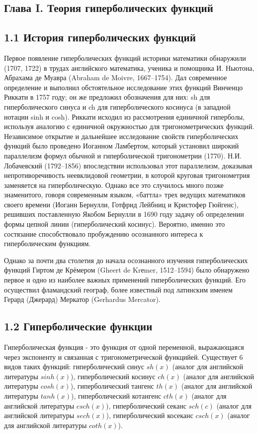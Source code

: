 \documentclass{article}
\begin{document}
\subsection*{Глава I. Теория гиперболических функций}

\subsection*{1.1 История гиперболических функций}

Первое появление гиперболических функций историки математики обнаружили (1707, 1722) в
трудах английского математика, ученика и помощника И. Ньютона, Абрахама де Муавра (Abraham
de Moivre, 1667–1754). Дал современное определение и выполнил обстоятельное исследование этих функций Винченцо Риккати в 1757 году; он
же предложил обозначения для них: sh для гиперболического синуса и ch для гиперболического
косинуса (в западной нотации sinh и cosh). Риккати исходил из рассмотрения единичной гиперболы, используя аналогию с единичной окружностью для тригонометрических функций. Независимое
открытие и дальнейшее исследование свойств гиперболических функций было проведено Иоганном
Ламбертом, который установил широкий параллелизм формул обычной и гиперболической тригонометрии (1770). Н.И. Лобачевский (1792–1856) впоследствии использовал этот параллелизм, доказывая непротиворечивость неевклидовой геометрии, в которой круговая тригонометрия заменяется
на гиперболическую. Однако все это случилось много позже знаменитого, говоря современным языком, «баттла» трех ведущих математиков своего времени (Иоганн Бернулли, Готфрид Лейбниц и
Кристофер Гюйгенс), решивших поставленную Якобом Бернулли в 1690 году задачу об определении
формы цепной линии (гиперболический косинус). Вероятно, именно это состязание способствовало
пробуждению осознанного интереса к гиперболическим функциям.

Однако за почти два столетия до начала осознанного изучения гиперболических функций Гиртом
де Крёмером (Gheert de Krеmer, 1512–1594) было обнаружено первое и одно из наиболее важных
применений гиперболических функций. Его осуществил фламандский географ, более известный под
латинским именем Герард (Джерард) Меркатор (Gerhardus Mercator).

\subsection*{1.2 Гиперболические функции}
Гиперболическая функция - это функция от одной переменной, выражающаяся через экспоненту и связанная с тригонометрической функцийей. Существует 6 видов таких функций: 
гиперболический синус $sh(x)$ (аналог для английской литературы $sinh(x)$), гиперболический косинус $ch(x)$ (аналог для английской литературы $cosh(x)$), 
гиперболический тангенс $th(x)$ (аналог для английской литературы $tanh(x)$), гиперболический котангенс $cth(x)$ (аналог для английской литературы $csch(x)$), 
гиперболический секанс $sch(c)$ (аналог для английской литературы $sech(x)$), гиперболический косеканс $csch(x)$ (аналог для английской литературы $coth(x)$).
\end{document}
